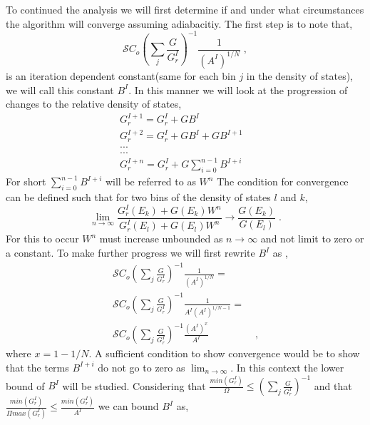 \documentclass[a4paper,12pt]{article}
\begin{document}
To continued the analysis we will first determine if and under what circumstances the algorithm will converge assuming adiabacitiy. The first step is to note that, 
\begin{equation}
\mathcal{S}{C_o}(\sum_{j}\frac{G}{G_r^I})^{-1}\frac{1}{(A^I)^{1/N}} \;,
\end{equation}
is an iteration dependent constant(same  for each bin $j$ in the density of states), we will call this constant $B^I$. In this manner we will look at the progression of changes to the relative density of states, 
\begin{equation}
\begin{split}
G_r^{I+1} = G_r^{I} + GB^I\\
G_r^{I+2} = G_r^{I} + GB^I + GB^{I+1} &\\
...&\\
...&\\
G_r^{I+n} = G_r^{I} + G\sum_{i=0}^{n-1}  B^{I+i} &
\end{split}
\label{Gr_IplusN}
\end{equation}
For short $\sum_{i=0}^{n-1}  B^{I+i}$ will be referred to as $W^n$
The condition for convergence can be defined such that for two bins of the density of states $l$ and $k$, 
\begin{equation}
\lim_{n\rightarrow \infty} \frac{G_r^{I}(E_k) + G(E_k)W^n}{G_r^{I}(E_l) + G(E_l)W^n} \rightarrow \frac{G(E_k)}{G(E_l)}\;.
\end{equation}
For this to occur $W^n$ must increase unbounded as $n\rightarrow \infty$ and not limit to zero or a constant. To make further progress we will first rewrite $B^I$ as , 
\begin{equation}
\begin{split}
\mathcal{S}{C_o}(\sum_{j}\frac{G}{G_r^{I}})^{-1}\frac{1}{(A^I)^{1/N}} = \\
\mathcal{S}{C_o}(\sum_{j}\frac{G}{G_r^{I}})^{-1}\frac{1}{A^I(A^I)^{1/N - 1}} = & \\
\mathcal{S}{C_o}(\sum_{j}\frac{G}{G_r^{I}})^{-1}\frac{(A^I)^{x}}{A^I} & \;,
\end{split}
\end{equation}
where $x = 1 - 1/N$. A sufficient condition to show convergence would be to show that the terms $B^{I+i}$ do not go to zero as $\lim_{n \rightarrow \infty}$. In this context the lower bound of $B^I$ will be studied. Considering that $ \frac{min(G_r^{I})}{\Omega} \le (\sum_{j}\frac{G}{G_r^{I}})^{-1}$ and that $\frac{min(G_r^{I})}{\Pi max(G_r^{I})} \le \frac{min(G_r^{I})}{A^I}$ we can bound $B^I$ as, 
\end{document}
